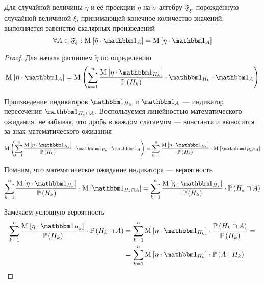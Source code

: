\begin{lemma}
    Для случайной величины $\eta$ и её проекции $\tilde{\eta}$
    на $\sigma$-алгебру $\mathfrak{F}_\xi$,
    порождённую случайной величиной $\xi$,
    принимающей конечное количество значений,
    выполняется равенство скалярных произведений
    \begin{equation}\label{scalarMulEquality}
        \forall A \in \mathfrak{F}_\xi:
            \Mean{ \tilde{\eta} \cdot \indicatorof{A} }
                = \Mean{ \eta \cdot \indicatorof{A} }
    \end{equation}
\end{lemma}
\begin{proof}
Для начала распишем $\tilde{\eta}$ по определению
$$\Mean{ \tilde{\eta} \cdot \indicatorof{A} }
    = \mean{\left( \sum_{k=1}^n
        \frac{\Mean{ \eta \cdot \indicatorof{H_k} }}
            {\probability{H_k}}
        \cdot \indicatorof{H_k} \cdot \indicatorof{A} \right)}$$

Произведение индикаторов $\indicatorof{H_k}$ и $\indicatorof{A}$ --- индикатор
пересечения $\indicatorof{H_k \cap A}$.
Воспользуемся линейностью математического ожидания, не забывая,
что дробь в каждом слагаемом --- константа
и выносится за знак математического ожидания
$$\mean{\left( \sum_{k=1}^n
        \frac{\Mean{ \eta \cdot \indicatorof{H_k} }}
            {\probability{H_k}}
        \cdot \indicatorof{H_k} \cdot \indicatorof{A} \right)}
    = \sum_{k=1}^n
        \frac{\Mean{ \eta \cdot \indicatorof{H_k} }}
            {\probability{H_k}}
        \cdot \Mean{ \indicatorof{H_k \cap A} }$$

Помним, что математическое ожидание индикатора --- вероятность
$$\sum_{k=1}^n
    \frac{\Mean{ \eta \cdot \indicatorof{H_k} }}{\probability{H_k}}
        \cdot \Mean{ \indicatorof{H_k \cap A} }
    = \sum_{k=1}^n \frac{\Mean{ \eta \cdot \indicatorof{H_k} }}
        {\probability{H_k}}
        \cdot \probability{H_k \cap A}$$

Замечаем условную вероятность
\begin{align*}
    \sum_{k=1}^n \frac{\Mean{ \eta \cdot \indicatorof{H_k} }}
        {\probability{H_k}} \cdot \probability{H_k \cap A}
    &= \sum_{k=1}^n \Mean{ \eta \cdot \indicatorof{H_k} }
        \cdot \frac{\probability{H_k \cap A}}{\probability{H_k}} = \\
    &= \sum_{k=1}^n \Mean{ \eta \cdot \indicatorof{H_k} }
        \cdot \probability{A \mid H_k}
\end{align*}


\end{proof}
